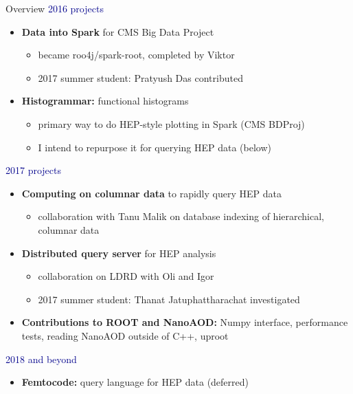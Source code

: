 \documentclass{beamer}
\begin{document}
\begin{frame}{Overview}
\vspace{0.25 cm}
\textcolor{darkblue}{2016 projects}
\begin{itemize}
\item {\bf Data into Spark} for CMS Big Data Project
\begin{itemize}
\item became roo4j/spark-root, completed by Viktor
\item 2017 summer student: Pratyush Das contributed
\end{itemize}

\item {\bf Histogrammar:} functional histograms
\begin{itemize}
\item primary way to do HEP-style plotting in Spark (CMS BDProj)
\item I intend to repurpose it for querying HEP data (below)
\end{itemize}
\end{itemize}

\textcolor{darkblue}{2017 projects}
\begin{itemize}
\item {\bf Computing on columnar data} to rapidly query HEP data
\begin{itemize}
\item collaboration with Tanu Malik on database indexing of hierarchical, columnar data
\end{itemize}

\item {\bf Distributed query server} for HEP analysis
\begin{itemize}
\item collaboration on LDRD with Oli and Igor
\item 2017 summer student: Thanat Jatuphattharachat investigated
\end{itemize}

\item {\bf Contributions to ROOT and NanoAOD:} Numpy interface, performance tests, reading NanoAOD outside of C++, uproot
\end{itemize}

\textcolor{darkblue}{2018 and beyond}
\begin{itemize}
\item {\bf Femtocode:} query language for HEP data (deferred)
\end{itemize}
\end{frame}
\end{document}
